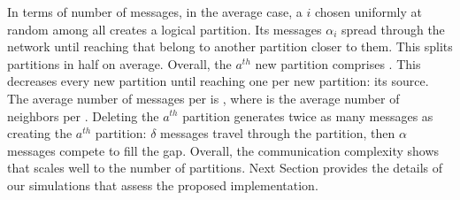 In terms of number of messages, in the average case, a \process $i$
chosen uniformly at random among all \processes creates a logical
partition. Its messages $\alpha_i$ spread through the network until
reaching \processes that belong to another partition closer to
them. This splits partitions in half on average. Overall, the $a^{th}$
new partition comprises  \processes. This decreases every new
partition until reaching one \process per new partition: its
source. The average number of messages per \process is
, where  is the average
number of neighbors per \process.
Deleting the $a^{th}$ partition generates twice as many messages as
creating the $a^{th}$ partition: $\delta$ messages travel through the
partition, then $\alpha$ messages compete to fill the gap.  Overall,
the communication complexity shows that \NAME scales well to the
number of partitions.
Next Section provides the details of our simulations that assess the
proposed implementation.



